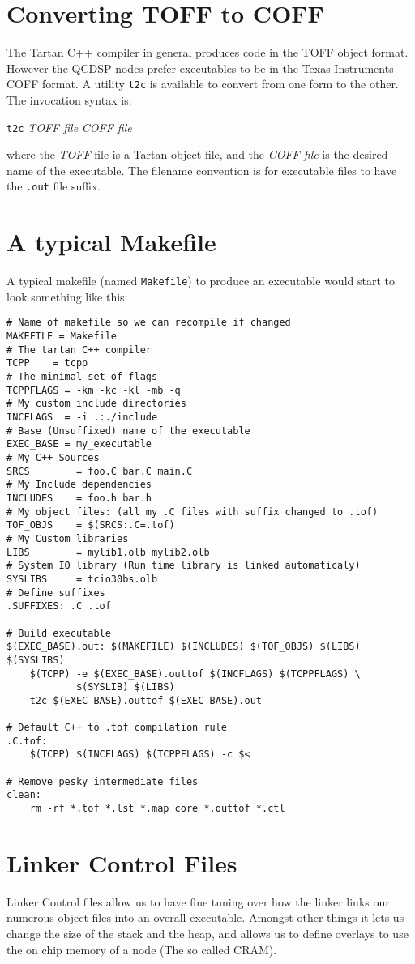 \section{Converting TOFF to COFF}
The Tartan C++ compiler in general produces code in the TOFF object format.
However the QCDSP nodes prefer executables to be in the Texas Instruments
COFF format. A utility {\tt t2c} is available to convert from one form to
the other. The invocation syntax is:
\begin{center}
{\tt t2c} {\em TOFF file} {\em COFF file}
\end{center}
where the {\em TOFF} file is a Tartan object file, and the {\em COFF file}
is the desired name of the executable. The filename convention is for executable
files to have the {\tt .out} file suffix.

\section{A typical Makefile}
A typical makefile (named {\tt Makefile}) to produce an executable would start to look something like this:
{\scriptsize
\begin{verbatim}
# Name of makefile so we can recompile if changed
MAKEFILE = Makefile
# The tartan C++ compiler
TCPP	= tcpp
# The minimal set of flags
TCPPFLAGS = -km -kc -kl -mb -q
# My custom include directories
INCFLAGS  = -i .:./include
# Base (Unsuffixed) name of the executable 
EXEC_BASE = my_executable
# My C++ Sources
SRCS        = foo.C bar.C main.C
# My Include dependencies
INCLUDES    = foo.h bar.h
# My object files: (all my .C files with suffix changed to .tof) 
TOF_OBJS    = $(SRCS:.C=.tof)
# My Custom libraries
LIBS	    = mylib1.olb mylib2.olb
# System IO library (Run time library is linked automaticaly)
SYSLIBS     = tcio30bs.olb
# Define suffixes
.SUFFIXES: .C .tof

# Build executable
$(EXEC_BASE).out: $(MAKEFILE) $(INCLUDES) $(TOF_OBJS) $(LIBS) $(SYSLIBS)
	$(TCPP) -e $(EXEC_BASE).outtof $(INCFLAGS) $(TCPPFLAGS) \
	        $(SYSLIB) $(LIBS)
	t2c $(EXEC_BASE).outtof $(EXEC_BASE).out

# Default C++ to .tof compilation rule
.C.tof:
	$(TCPP) $(INCFLAGS) $(TCPPFLAGS) -c $<

# Remove pesky intermediate files 
clean:
	rm -rf *.tof *.lst *.map core *.outtof *.ctl
\end{verbatim}
}

\section{Linker Control Files}
Linker Control files allow us to have fine tuning over how the linker
links our numerous object files into an overall executable. Amongst 
other things it lets us change the size of the stack and the heap, 
and allows us to define overlays to use the on chip memory of a node
(The so called CRAM).

